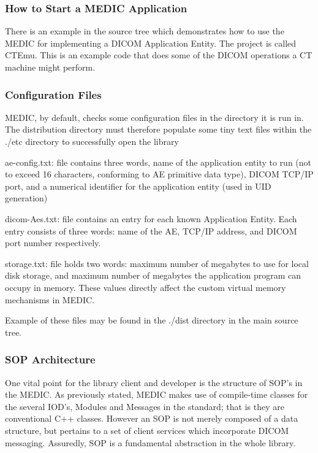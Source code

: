 \documentclass[a4paper,10pt]{article}
\begin{document}
\subsubsection{How to Start a MEDIC Application}

There is an example in the source tree which demonstrates how to use the MEDIC
for implementing a DICOM Application Entity. The project is called
CTEmu. This is an example code that does some of the DICOM operations a CT
machine might perform.


\subsubsection{Configuration Files}


MEDIC, by default, checks some configuration files in the directory it is run
in. The distribution directory must therefore populate some tiny text files
within the ./etc directory to successfully open the library

ae-config.txt: file contains three words, name of the application entity to
run (not to exceed 16 characters, conforming to AE primitive data type),
DICOM TCP/IP port, and a numerical identifier for the application entity
(used in UID generation)

dicom-Aes.txt: file contains an entry for each known Application Entity.
Each entry consists of three words: name of the AE, TCP/IP address, and
DICOM port number respectively.

storage.txt: file holds two words: maximum number of megabytes to use for
local disk storage, and maximum number of megabytes the application program
can occupy in memory. These values directly affect the custom virtual memory
mechanisms in MEDIC.

Example of these files may be found in the ./dist directory in the main
source tree.


\subsubsection{SOP Architecture}

One vital point for the library client and developer is the structure of
SOP{'}s in the MEDIC. As previously stated, MEDIC makes use of compile-time
classes for the several IOD{'}s, Modules and Messages in the standard; that
is they are conventional C++ classes. However an SOP is not merely composed
of a data structure, but pertains to a set of client services which
incorporate DICOM messaging. Assuredly, SOP is a fundamental abstraction in
the whole library.
\end{document}
